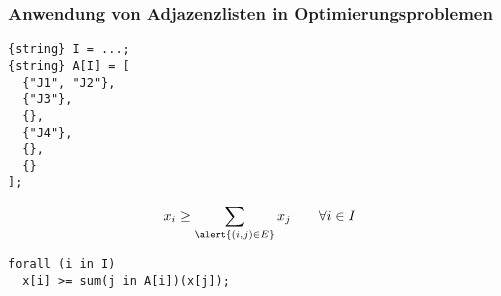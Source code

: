 \begin{frame}[fragile]
 \frametitle{Anwendung von Adjazenzlisten in Optimierungsproblemen}
 \bigskip
\begin{lstlisting}[numbers=none,basicstyle=\scriptsize\ttfamily]
{string} I = ...;
{string} A[I] = [
  {"J1", "J2"},
  {"J3"},
  {},
  {"J4"},
  {},
  {}
];
\end{lstlisting}
\vspace{-\baselineskip}
\[
  x_i \geq \sum_{\alert{(i, j) \in E}}x_j\qquad\forall i\in I  
\]
\begin{center}
\end{center}
\begin{lstlisting}[numbers=none]
forall (i in I)
  x[i] >= sum(j in A[i])(x[j]);
\end{lstlisting}
\end{frame}

